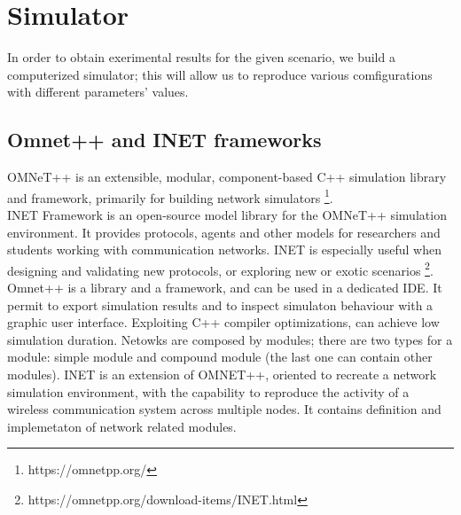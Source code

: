 %
\chapter{Simulator}
In order to obtain exerimental results for the given scenario, we build a computerized simulator;
this will allow us to reproduce various comfigurations with different parameters' values.\\
\section{Omnet++ and INET frameworks}
OMNeT++ is an extensible, modular, component-based C++ simulation library and framework, 
primarily for building network simulators \footnote{https://omnetpp.org/}.\\
INET Framework is an open-source model library for the OMNeT++ simulation environment. 
It provides protocols, agents and other models for researchers and students working with 
communication networks. INET is especially useful when designing and validating new protocols, 
or exploring new or exotic scenarios \footnote{https://omnetpp.org/download-items/INET.html}.\\
Omnet++ is a library and a framework, and can be used in a dedicated IDE. It permit to export simulation results
and to inspect simulaton behaviour with a graphic user interface. Exploiting C++ compiler optimizations, can achieve low simulation duration.
Netowks are composed by modules; there are two types for a module: simple module and compound module (the last one can contain other modules).
INET is an extension of OMNET++, oriented to recreate a network simulation environment, with the capability to reproduce the activity
of a wireless communication system across multiple nodes. It contains definition and implemetaton of network related modules.
